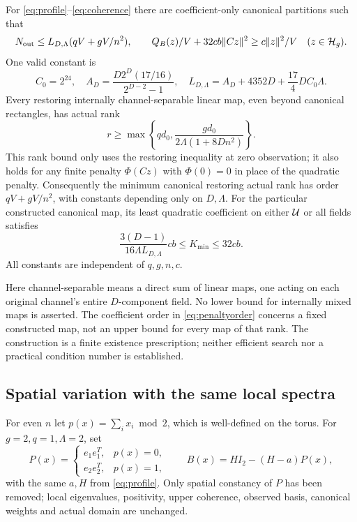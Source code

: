 \begin{theorem}\label{thm:fixed}
For \eqref{eq:profile}--\eqref{eq:coherence} there are coefficient-only canonical
partitions such that
\begin{equation}\label{eq:fixedupper}
 N_{\rm out}\leq L_{D,\Lambda}(qV+gV/n^2),\qquad
 Q_B(z)/V+32cb\lVert Cz\rVert^2\geq c\lVert z\rVert^2/V
 \quad(z\in\mathcal H_g).
\end{equation}
One valid constant is
\[
 C_0=2^{24},\quad
 A_D=\frac{D2^D(17/16)}{2^{D-2}-1},\quad
 L_{D,\Lambda}=A_D+4352D+\frac{17}{4}DC_0\Lambda.
\]
Every restoring internally channel-separable linear map, even beyond canonical
rectangles, has actual rank
\begin{equation}\label{eq:ranklower}
 r\geq\max\left\{qd_0,
 \frac{gd_0}{2\Lambda(1+8Dn^2)}\right\}.
\end{equation}
This rank bound only uses the restoring inequality at zero observation; it
also holds for any finite penalty $\Phi(Cz)$ with $\Phi(0)=0$ in place of the
quadratic penalty. Consequently the minimum canonical restoring actual rank
has order $qV+gV/n^2$, with constants depending only on $D,\Lambda$.
For the particular constructed canonical map, its least quadratic coefficient
on either $\mathcal U$ or all fields satisfies
\begin{equation}\label{eq:penaltyorder}
 \frac{3(D-1)}{16\Lambda L_{D,\Lambda}}cb
 \leq K_{\min}\leq32cb.
\end{equation}
All constants are independent of $q,g,n,c$.
\end{theorem}
Here channel-separable means a direct sum of linear maps, one acting on each
original channel's entire $D$-component field. No lower bound for internally
mixed maps is asserted. The coefficient order in \eqref{eq:penaltyorder}
concerns a fixed constructed map, not an upper bound for every map of that rank.
The construction is a finite existence prescription; neither efficient search
nor a practical condition number is established.

\subsection{Spatial variation with the same local spectra}
For even $n$ let $p(x)=\sum_i x_i\bmod2$, which is well-defined on the torus.
For $g=2,q=1,\Lambda=2$, set
\begin{equation}\label{eq:checker}
 P(x)=\begin{cases}e_1e_1^T,&p(x)=0,\\e_2e_2^T,&p(x)=1,\end{cases}
 \qquad B(x)=HI_2-(H-a)P(x),
\end{equation}
with the same $a,H$ from \eqref{eq:profile}. Only spatial constancy of $P$
has been removed; local eigenvalues, positivity, upper coherence, observed
basis, canonical weights and actual domain are unchanged.

